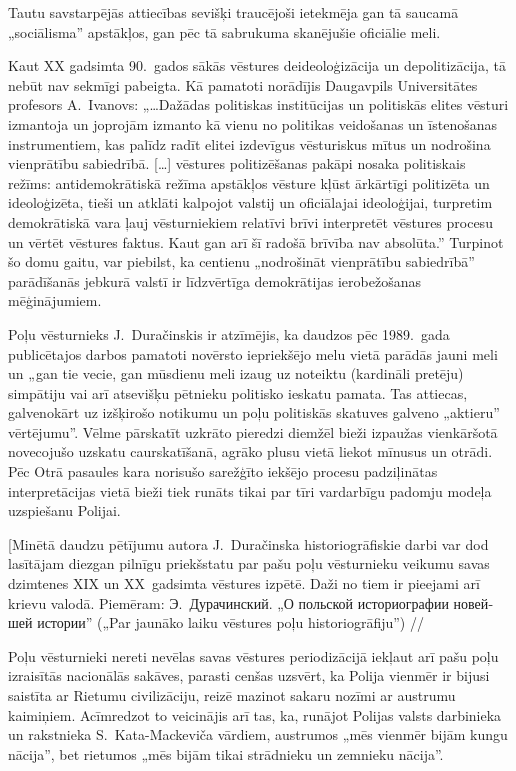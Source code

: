 \documentclass[twoside,a5paper,12pt,fleqn,openany]{extbook}
\newcommand{\rutxti}[1]{\textrussian{#1}}
\newcommand{\citespace}{[\dots{}]}
\begin{document}
Tautu savstarpējās attiecības sevišķi traucējoši ietekmēja gan tā saucamā „sociālisma” apstākļos, gan pēc tā sabrukuma skanējušie oficiālie meli.

Kaut XX gadsimta 90.~gados sākās vēstures deideoloģizācija un depolitizācija, tā nebūt nav sekmīgi pabeigta. Kā pamatoti norādījis Daugavpils Universitātes profesors A.~Ivanovs: „\dots{}Dažādas politiskas institūcijas un politiskās elites vēsturi izmantoja un joprojām izmanto kā vienu no politikas veidošanas un īstenošanas instrumentiem, kas palīdz radīt elitei izdevīgus vēsturiskus mītus un nodrošina vienprātību sabiedrībā. \citespace{} vēstures politizēšanas pakāpi nosaka politiskais režīms: antidemokrātiskā režīma apstākļos vēsture kļūst ārkārtīgi politizēta un ideoloģizēta, tieši un atklāti kalpojot valstij un oficiālajai ideoloģijai, turpretim demokrātiskā vara ļauj vēsturniekiem relatīvi brīvi interpretēt vēstures procesu un vērtēt vēstures faktus. Kaut gan arī šī radošā brīvība nav absolūta.” Turpinot šo domu gaitu, var piebilst, ka centienu „nodrošināt vienprātību sabiedrībā” parādīšanās jebkurā valstī ir līdzvērtīga demokrātijas ierobežošanas mēģinājumiem.

Poļu vēsturnieks J.~Duračinskis ir atzīmējis, ka daudzos pēc 1989.~gada publicētajos darbos pamatoti novērsto iepriekšējo melu vietā parādās jauni meli un „gan tie vecie, gan mūsdienu meli izaug uz noteiktu (kardināli pretēju) simpātiju vai arī atsevišķu pētnieku politisko ieskatu pamata. Tas attiecas, galvenokārt uz izšķirošo notikumu un poļu politiskās skatuves galveno „aktieru” vērtējumu”. Vēlme pārskatīt uzkrāto pieredzi diemžēl bieži izpaužas vienkāršotā novecojušo uzskatu caurskatīšanā, agrāko plusu vietā liekot mīnusus un otrādi. Pēc Otrā pasaules kara norisušo sarežģīto iekšējo procesu padziļinātas interpretācijas vietā bieži tiek runāts tikai par tīri vardarbīgu padomju modeļa uzspiešanu Polijai.

[Minētā daudzu pētījumu autora J.~Duračinska historiogrāfiskie darbi var dod lasītājam diezgan pilnīgu priekšstatu par pašu poļu vēsturnieku veikumu savas dzimtenes XIX un XX~gadsimta vēstures izpētē. Daži no tiem ir pieejami arī krievu valodā. Piemēram: \rutxti{Э.~Дурачинский}. „\rutxti{О польской историографии новейшей истории}” („Par jaunāko laiku vēstures poļu historiogrāfiju”) // %

Poļu vēsturnieki nereti nevēlas savas vēstures periodizācijā iekļaut arī pašu poļu izraisītās nacionālās sakāves, parasti cenšas uzsvērt, ka Polija vienmēr ir bijusi saistīta ar Rietumu civilizāciju, reizē mazinot sakaru nozīmi ar austrumu kaimiņiem. Acīmredzot to veicinājis arī tas, ka, runājot Polijas valsts darbinieka un rakstnieka S.~Kata-Mackeviča vārdiem, austrumos „mēs vienmēr bijām kungu nācija”, bet rietumos „mēs bijām tikai strādnieku un zemnieku nācija”.
\end{document}
